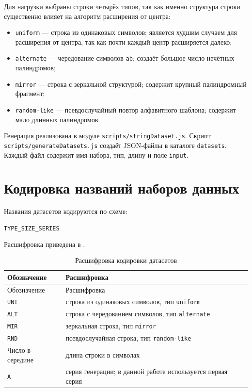 Для нагрузки выбраны строки четырёх типов, так как именно структура строки существенно влияет на алгоритм расширения от центра:
\begin{itemize}
    \item \texttt{uniform} --- строка из одинаковых символов; является худшим случаем для расширения от центра, так как почти каждый центр расширяется далеко;
    \item \texttt{alternate} --- чередование символов \texttt{ab}; создаёт большое число нечётных палиндромов;
    \item \texttt{mirror} --- строка с зеркальной структурой; содержит крупный палиндромный фрагмент;
    \item \texttt{random-like} --- псевдослучайный повтор алфавитного шаблона; содержит мало длинных палиндромов.
\end{itemize}

Генерация реализована в модуле \texttt{scripts/stringDataset.js}. Скрипт \texttt{scripts/generateDatasets.js} создаёт JSON-файлы в каталоге \texttt{datasets}. Каждый файл содержит имя набора, тип, длину и поле \texttt{input}.

\section{Кодировка названий наборов данных} \label{ch2:sec3}

Названия датасетов кодируются по схеме:
\begin{center}
\texttt{TYPE\_SIZE\_SERIES}
\end{center}

Расшифровка приведена в .

\noindent
\begingroup
\centering
\small
\begin{longtable}[c]{|p{4cm}|p{11cm}|}
    \caption{Расшифровка кодировки датасетов}
    \label{tab:dataset-codes}
    \\
    \hline
    Обозначение & Расшифровка \\ \hline
    \endfirsthead
    \hline
    Обозначение & Расшифровка \\ \hline
    \endhead
    \hline
    \texttt{UNI} & строка из одинаковых символов, тип \texttt{uniform} \\ \hline
    \texttt{ALT} & строка с чередованием символов, тип \texttt{alternate} \\ \hline
    \texttt{MIR} & зеркальная строка, тип \texttt{mirror} \\ \hline
    \texttt{RND} & псевдослучайная строка, тип \texttt{random-like} \\ \hline
    Число в середине & длина строки в символах \\ \hline
    \texttt{A} & серия генерации; в данной работе используется первая серия \\ \hline
\end{longtable}
\normalsize
\endgroup

